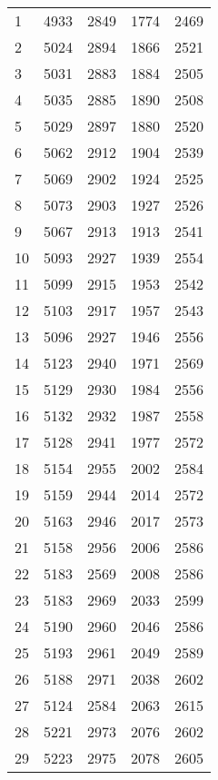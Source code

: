 \begin{center}
   \tabletail{\hline}
      \begin{supertabular}{|l|cc|cc|}
      1  & 4933 & 2849 & 1774 & 2469 \\
      2  & 5024 & 2894 & 1866 & 2521 \\
      3  & 5031 & 2883 & 1884 & 2505 \\
      4  & 5035 & 2885 & 1890 & 2508 \\
      5  & 5029 & 2897 & 1880 & 2520 \\
      6  & 5062 & 2912 & 1904 & 2539 \\
      7  & 5069 & 2902 & 1924 & 2525 \\
      8  & 5073 & 2903 & 1927 & 2526 \\
      9  & 5067 & 2913 & 1913 & 2541 \\
      10 & 5093 & 2927 & 1939 & 2554 \\
      11 & 5099 & 2915 & 1953 & 2542 \\
      12 & 5103 & 2917 & 1957 & 2543 \\
      13 & 5096 & 2927 & 1946 & 2556 \\
      14 & 5123 & 2940 & 1971 & 2569 \\
      15 & 5129 & 2930 & 1984 & 2556 \\
      16 & 5132 & 2932 & 1987 & 2558 \\
      17 & 5128 & 2941 & 1977 & 2572 \\
      18 & 5154 & 2955 & 2002 & 2584 \\
      19 & 5159 & 2944 & 2014 & 2572 \\
      20 & 5163 & 2946 & 2017 & 2573 \\
      21 & 5158 & 2956 & 2006 & 2586 \\
      22 & 5183 & 2569 & 2008 & 2586 \\
      23 & 5183 & 2969 & 2033 & 2599 \\
      24 & 5190 & 2960 & 2046 & 2586 \\
      25 & 5193 & 2961 & 2049 & 2589 \\
      26 & 5188 & 2971 & 2038 & 2602 \\
      27 & 5124 & 2584 & 2063 & 2615 \\
      28 & 5221 & 2973 & 2076 & 2602 \\
      29 & 5223 & 2975 & 2078 & 2605 \\

\end{supertabular}
\end{center}
